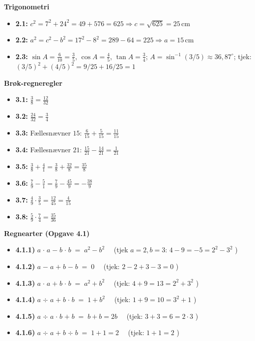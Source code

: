 \documentclass[11pt,a4paper]{article}
\begin{document}
\noindent\textbf{Trigonometri}
\begin{itemize}[leftmargin=2em, itemsep=2pt]
  \item \textbf{2.1:} $c^{2}=7^{2}+24^{2}=49+576=625 \Rightarrow c=\sqrt{625}=25\,\text{cm}$
  \item \textbf{2.2:} $a^{2}=c^{2}-b^{2}=17^{2}-8^{2}=289-64=225 \Rightarrow a=15\,\text{cm}$
  \item \textbf{2.3:} $\sin A = \tfrac{6}{10}=\tfrac{3}{5}$, $\cos A = \tfrac{4}{5}$, $\tan A = \tfrac{3}{4}$; $A = \sin^{-1}(3/5) \approx 36{,}87^{\circ}$; tjek: $(3/5)^{2}+(4/5)^{2} = 9/25+16/25 = 1$ \checkmark
\end{itemize}

\noindent\textbf{Brøk-regneregler}
\begin{itemize}[leftmargin=2em, itemsep=2pt]
  \item \textbf{3.1:} $\tfrac{3}{8} = \tfrac{12}{32}$
  \item \textbf{3.2:} $\tfrac{24}{32} = \tfrac{3}{4}$
  \item \textbf{3.3:} Fællesnævner $15$: $\tfrac{6}{15}+\tfrac{5}{15} = \tfrac{11}{15}$
  \item \textbf{3.4:} Fællesnævner $21$: $\tfrac{15}{21}-\tfrac{14}{21} = \tfrac{1}{21}$
  \item \textbf{3.5:} $\tfrac{3}{8}+\tfrac{4}{1} = \tfrac{3}{8}+\tfrac{32}{8} = \tfrac{35}{8}$
  \item \textbf{3.6:} $\tfrac{7}{9}-\tfrac{5}{1} = \tfrac{7}{9}-\tfrac{45}{9} = -\tfrac{38}{9}$
  \item \textbf{3.7:} $\tfrac{4}{9}\cdot\tfrac{3}{5} = \tfrac{12}{45} = \tfrac{4}{15}$
  \item \textbf{3.8:} $\tfrac{5}{9}\cdot\tfrac{7}{4} = \tfrac{35}{36}$
\end{itemize}

\noindent\textbf{Regnearter (Opgave 4.1)}
\begin{itemize}[leftmargin=2em, itemsep=2pt]
  \item \textbf{4.1.1)} $a \;\mathbf{\cdot}\; a \;\mathbf{-}\; b \;\mathbf{\cdot}\; b \;=\; a^{2} - b^{2}$ \ \ (tjek $a=2,b=3$: $4-9=-5 = 2^{2}-3^{2}$ \checkmark)
  \item \textbf{4.1.2)} $a \;\mathbf{-}\; a \;\mathbf{+}\; b \;\mathbf{-}\; b \;=\; 0$ \ \ (tjek: $2-2+3-3=0$ \checkmark)
  \item \textbf{4.1.3)} $a \;\mathbf{\cdot}\; a \;\mathbf{+}\; b \;\mathbf{\cdot}\; b \;=\; a^{2} + b^{2}$ \ \ (tjek: $4+9=13 = 2^{2}+3^{2}$ \checkmark)
  \item \textbf{4.1.4)} $a \;\mathbf{\div}\; a \;\mathbf{+}\; b \;\mathbf{\cdot}\; b \;=\; 1 + b^{2}$ \ \ (tjek: $1+9=10 = 3^{2}+1$ \checkmark)
  \item \textbf{4.1.5)} $a \;\mathbf{\div}\; a \;\mathbf{\cdot}\; b \;\mathbf{+}\; b \;=\; b + b = 2b$ \ \ (tjek: $3+3=6 = 2\cdot 3$ \checkmark)
  \item \textbf{4.1.6)} $a \;\mathbf{\div}\; a \;\mathbf{+}\; b \;\mathbf{\div}\; b \;=\; 1 + 1 = 2$ \ \ (tjek: $1+1=2$ \checkmark)
\end{itemize}
\end{document}
